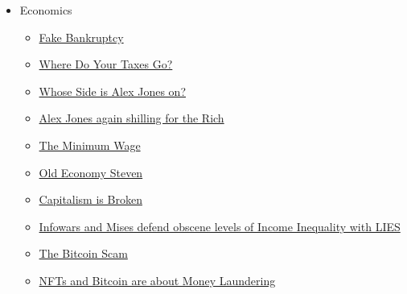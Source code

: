 \documentclass{article}
\newcommand{\insertmydocument}[2]{ %
  \item \href{http://www.mileswmathis.com/#2}{#1}
}
\begin{document}
\begin{itemize}
\begin{itemize}
    \item Economics
    \begin{itemize}

      \insertmydocument{Fake Bankruptcy}{sachs.pdf}
      \insertmydocument{Where Do Your Taxes Go?}{taxes.pdf}
      \insertmydocument{Whose Side is Alex Jones on?}{taxes2.pdf}
      \insertmydocument{Alex Jones again shilling for the Rich}{taxes3.pdf}
      \insertmydocument{The Minimum Wage}{wage.pdf}
      \insertmydocument{Old Economy Steven}{oldecon.pdf}
      \insertmydocument{Capitalism is Broken}{skimmers.pdf}
      \insertmydocument{Infowars and Mises defend obscene levels of Income Inequality with LIES}{mises2.pdf}
      \insertmydocument{The Bitcoin Scam}{bitfraud.pdf}
      \insertmydocument{NFTs and Bitcoin are about Money Laundering}{nft.pdf}
    \end{itemize}
  \end{itemize}
\end{itemize}
\end{document}
